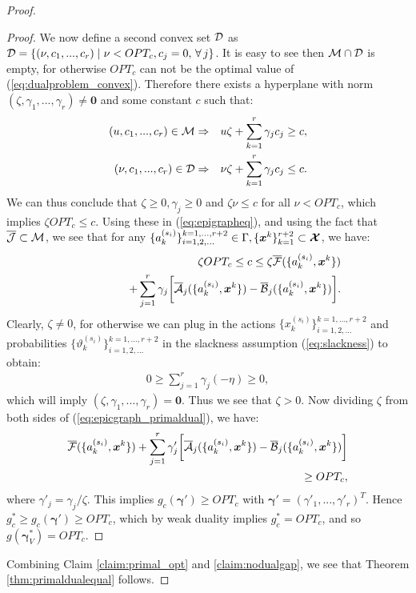 \documentclass[journal]{IEEEtran}
\newcommand{\bv}[1]{{\boldsymbol{#1} }}
\newcommand{\script}[1]{{{\cal{#1} }}}
\begin{document}
\begin{proof}
\begin{proof}
We now define a second convex set $\script{D}$ as $\script{D}=\{(\nu, c_1, ...,c_r)\left.|\right. \nu<OPT_c, c_j=0, \,\forall\,j \}$. 
It is easy to see then $\script{M}\cap\script{D}$ is empty, for otherwise $OPT_c$ can not be the optimal value of (\ref{eq:dualproblem_convex}). Therefore there exists a hyperplane with norm $(\zeta, \gamma_1, ..., \gamma_r)\neq\bv{0}$ and some constant $c$ such that:
\begin{eqnarray}
(u, c_1, ..., c_r)\in\script{M} &\Rightarrow& u\zeta+\sum_{k=1}^r\gamma_jc_j\geq c, \nonumber\\
(\nu, c_1, ..., c_r)\in\script{D} &\Rightarrow& \nu\zeta+\sum_{k=1}^r\gamma_jc_j\leq c. \label{eq:epigrapheq}
\end{eqnarray}
We can thus conclude that $\zeta\geq0, \gamma_j\geq0$ and $\zeta \nu\leq c$ for all $\nu<OPT_c$, which implies $\zeta OPT_c\leq c$. Using these in (\ref{eq:epigrapheq}), and using the fact that $\overline{\script{J}}\subset\script{M}$, we see that for any $\{a^{(s_i)}_k\}_{i=1, 2, ...}^{k=1, ..., r+2}\in\Gamma, \{\bv{x}^{k}\}_{k=1}^{r+2 }\subset\bv{\script{X}}$, we have:
\begin{eqnarray}
\hspace{-.3in}&&\zeta OPT_c\leq c\leq\zeta\overline{\script{F}}(\{a^{(s_i)}_k, \bv{x}^k\})\label{eq:epicgraph_primaldual} \\ 
\hspace{-.3in}&&\qquad\qquad\qquad+\sum_{j=1}^{r}\gamma_j\bigg[\overline{\script{A}}_j(\{a^{(s_i)}_k, \bv{x}^k\})-\overline{\script{B}}_j(\{a^{(s_i)}_k, \bv{x}^k\})\bigg]. \nonumber
\end{eqnarray}
Clearly, $\zeta\neq0$, for otherwise we can plug in the actions $\{x^{(s_i)}_k\}_{i=1, 2, ...}^{k=1, ..., r+2}$ and probabilities $\{\vartheta^{(s_i)}_k\}_{i=1, 2, ...}^{k=1, ..., r+2}$ in the slackness assumption (\ref{eq:slackness}) to obtain:
\begin{eqnarray*}
0\geq\sum_{j=1}^r\gamma_j(-\eta)\geq0,
\end{eqnarray*}
which will imply $(\zeta, \gamma_1, ..., \gamma_r)=\bv{0}$. Thus we see that $\zeta>0$. Now dividing $\zeta$ from both sides of (\ref{eq:epicgraph_primaldual}), we have:
\begin{eqnarray*}
\overline{\script{F}}(\{a^{(s_i)}_k, \bv{x}^k\})+\sum_{j=1}^{r}\gamma'_j\bigg[\overline{\script{A}}_j(\{a^{(s_i)}_k, \bv{x}^k\})-\overline{\script{B}}_j(\{a^{(s_i)}_k, \bv{x}^k\})\bigg]\\
 \geq  OPT_c, %
\end{eqnarray*}
where $\gamma'_j=\gamma_j/\zeta$. This implies $g_c(\bv{\gamma}')\geq OPT_c$ with $\bv{\gamma}'=(\gamma'_1, ..., \gamma'_r)^T$. Hence $g_c^*\geq g_c(\bv{\gamma}')\geq OPT_c$, which by weak duality implies $g_c^*= OPT_c$, and so $g(\bv{\gamma}^*_V)=OPT_c$. 
\end{proof}
Combining Claim \ref{claim:primal_opt} and \ref{claim:nodualgap}, we see that Theorem \ref{thm:primaldualequal} follows.
\end{proof}
\end{document}
